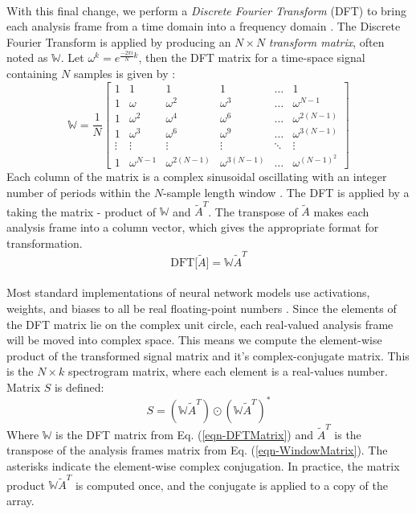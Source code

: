 \documentclass[12pt,letterpaper]{article}
\begin{document}
\paragraph*{}With this final change, we perform a \textit{Discrete Fourier Transform} (DFT) to bring each analysis frame from a time domain into a frequency domain \cite{Olson,Peatross,Virtanen}. The Discrete Fourier Transform is applied by producing an $N \times N$ \textit{transform matrix}, often noted as $\mathbb{W}$. Let $\omega^k = e^{\frac{-2\pi i}{N}k}$, then the DFT matrix for a time-space signal containing $N$ samples is given by \cite{Taylor,Peatross,Virtanen}:
\begin{equation}
\label{eqn-DFTMatrix}
\mathbb{W} = \frac{1}{N}
\begin{bmatrix}
1 & 1 & 1 & 1 & \hdots & 1 \\
1 & \omega		& \omega^2 & \omega^3 & \hdots & \omega^{N-1} \\
1 & \omega^2	& \omega^4 & \omega^6 & \hdots & \omega^{2(N-1)} \\
1 & \omega^3	& \omega^6 & \omega^9 & \hdots & \omega^{3(N-1)} \\
\vdots & \vdots & \vdots & \vdots & \ddots & \vdots \\
1 & \omega^{N-1} & \omega^{2(N-1)} & \omega^{3(N-1)} & \hdots & \omega^{(N-1)^2}
\end{bmatrix}
\end{equation}
Each column of the matrix is a complex sinusoidal oscillating with an integer number of periods within the $N$-sample length window \cite{Short,Peatross}. The DFT is applied by a taking the matrix - product of $\mathbb{W}$ and $\widetilde{A}^T$. The transpose of $\widetilde{A}$ makes each analysis frame into a column vector, which gives the appropriate format for transformation.
\begin{equation}
\label{eqn-DFT}
\text{DFT}\big[ \widetilde{A} \big] = \mathbb{W}\widetilde{A}^T
\end{equation}

\paragraph*{}Most standard implementations of neural network models use activations, weights, and biases to all be real floating-point numbers \cite{Levine,Loy,Tensorflow}. Since the elements of the DFT matrix lie on the complex unit circle, each real-valued analysis frame will be moved into complex space. This means we compute the element-wise product of the transformed signal matrix and it's complex-conjugate matrix. This is the $N \times k$
spectrogram matrix, where each element is a real-values number. Matrix $S$ is defined:
\begin{equation}
\label{eqn-Spectrogram}
S = (\mathbb{W}\widetilde{A}^T) \odot (\mathbb{W}\widetilde{A}^T)^*
\end{equation}
Where $\mathbb{W}$ is the DFT matrix from Eq. (\ref{eqn-DFTMatrix}) and $\widetilde{A}^T$ is the transpose of the analysis frames matrix from Eq. (\ref{eqn-WindowMatrix}). The asterisks indicate the element-wise complex conjugation. In practice, the matrix product $\mathbb{W}\widetilde{A}^T$ is computed once, and the conjugate is applied to a copy of the array.
\end{document}
